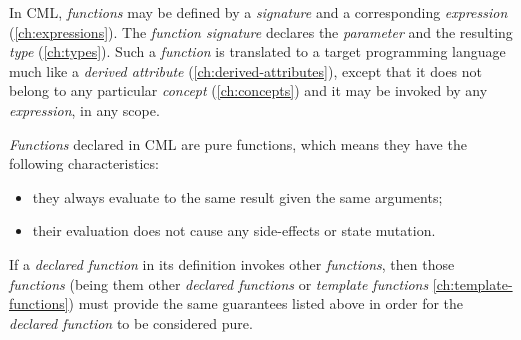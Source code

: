 In CML, \emph{functions} may be defined by a \emph{signature}
and a corresponding \emph{expression} (\ref{ch:expressions}).
The \emph{function signature} declares the \emph{parameter}
and the resulting \emph{type} (\ref{ch:types}).
Such a \emph{function} is translated to a target programming language
much like a \emph{derived attribute} (\ref{ch:derived-attributes}),
except that it does not belong to any particular \emph{concept} (\ref{ch:concepts})
and it may be invoked by any \emph{expression}, in any scope.

\emph{Functions} declared in CML are pure functions,
which means they have the following characteristics:

\begin{itemize}
\item they always evaluate to the same result given the same arguments;
\item their evaluation does not cause any side-effects or state mutation.
\end{itemize}

If a \emph{declared function} in its definition invokes other \emph{functions},
then those \emph{functions}
(being them other \emph{declared functions} or \emph{template functions} \ref{ch:template-functions})
must provide the same guarantees listed above in order
for the \emph{declared function} to be considered pure.
